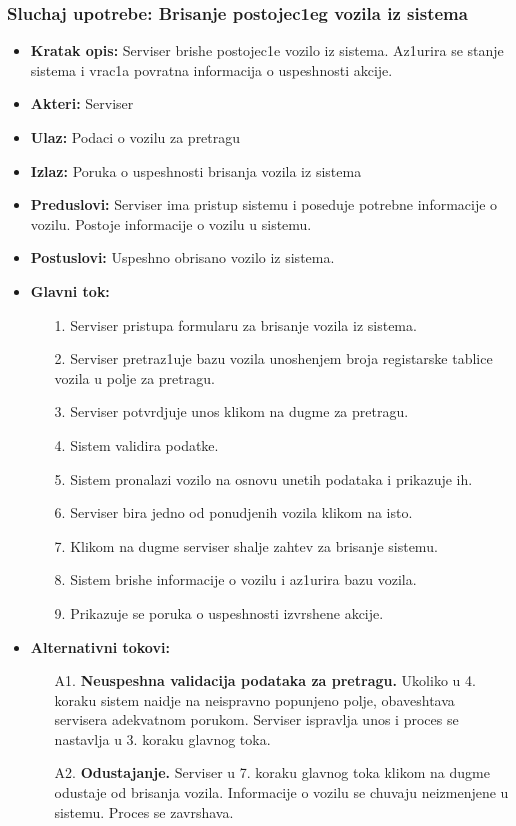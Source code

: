 \subsubsection{Sluchaj upotrebe: Brisanje postojec1eg vozila iz sistema}

\begin{itemize}
\item{\textbf{Kratak opis:} Serviser brishe postojec1e vozilo iz sistema. Az1urira se stanje sistema i vrac1a povratna informacija o uspeshnosti akcije.}
\item{\textbf{Akteri:} Serviser}
\item{\textbf{Ulaz:} Podaci o vozilu za pretragu }
\item{\textbf{Izlaz:} Poruka o uspeshnosti brisanja vozila iz sistema }
\item{\textbf{Preduslovi:} Serviser ima pristup sistemu i poseduje potrebne informacije o vozilu. Postoje informacije o vozilu u sistemu.}
\item{\textbf{Postuslovi:} Uspeshno obrisano vozilo iz sistema.}
\item{\textbf{Glavni tok:} 
\begin{enumerate}
    \item [1.] Serviser pristupa formularu za brisanje vozila iz sistema.
    \item[2.] Serviser pretraz1uje bazu vozila unoshenjem broja registarske tablice vozila u polje za pretragu.
    \item[3.] Serviser potvrdjuje unos klikom na dugme za pretragu.
    \item[4.] Sistem validira podatke.
    \item[5.] Sistem pronalazi vozilo na osnovu unetih podataka i prikazuje ih.
    \item[6.] Serviser bira jedno od ponudjenih vozila klikom na isto.
    \item[7.] Klikom na dugme serviser shalje zahtev za brisanje sistemu.
    \item[8.] Sistem brishe informacije o vozilu i az1urira bazu vozila.
    \item[9.] Prikazuje se poruka o uspeshnosti izvrshene akcije.
\end{enumerate}

}
\item{\textbf{Alternativni tokovi:} 
\begin{enumerate}
    \item [A1.] \textbf{Neuspeshna validacija podataka za pretragu.} Ukoliko u 4. koraku sistem naidje na neispravno popunjeno polje, obaveshtava servisera adekvatnom porukom. Serviser ispravlja unos i proces se nastavlja u 3. koraku glavnog toka.
    \item[A2.] \textbf{Odustajanje.} Serviser u 7. koraku glavnog toka klikom na dugme odustaje od brisanja vozila. Informacije o vozilu se chuvaju neizmenjene u sistemu. Proces se zavrshava.
\end{enumerate}
}
\end{itemize}


